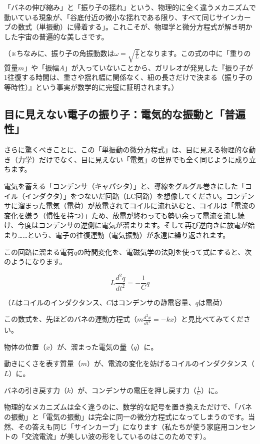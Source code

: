 「バネの伸び縮み」と「振り子の揺れ」という、物理的に全く違うメカニズムで動いている現象が、「谷底付近の微小な揺れである限り、すべて同じサインカーブの数式（単振動）に帰着する」。これこそが、物理学と微分方程式が解き明かした宇宙の普遍的な美しさです。

（※ちなみに、振り子の角振動数は\(\omega = \sqrt{\frac{g}{L}}\)となります。この式の中に「重りの質量\(m\)」や「振幅\(A\)」が入っていないことから、ガリレオが発見した『振り子が1往復する時間は、重さや揺れ幅に関係なく、紐の長さだけで決まる（振り子の等時性）』という事実が数学的に完璧に証明されます。）

\subsection{目に見えない電子の振り子：電気的な振動と「普遍性」}

さらに驚くべきことに、この「単振動の微分方程式」は、目に見える物理的な動き（力学）だけでなく、目に見えない「電気」の世界でも全く同じように成り立ちます。

電気を蓄える「コンデンサ（キャパシタ）」と、導線をグルグル巻きにした「コイル（インダクタ）」をつないだ回路（LC回路）を想像してください。コンデンサに溜まった電気（電荷）が放電されてコイルに流れ込むと、コイルは「電流の変化を嫌う（慣性を持つ）」ため、放電が終わっても勢い余って電流を流し続け、今度はコンデンサの逆側に電気が溜まります。そして再び逆向きに放電が始まり\ldots{}\ldots{}という、電子の往復運動（電気振動）が永遠に繰り返されます。

この回路に溜まる電荷\(q\)の時間変化を、電磁気学の法則を使って式にすると、次のようになります。

\[L \frac{d^2q}{dt^2} = -\frac{1}{C}q\]

（\(L\)はコイルのインダクタンス、\(C\)はコンデンサの静電容量、\(q\)は電荷）

この数式を、先ほどのバネの運動方程式（\(m \frac{d^2x}{dt^2} = -kx\)）と見比べてみてください。

物体の位置（\(x\)）が、溜まった電気の量（\(q\)）に。

動きにくさを表す質量（\(m\)）が、電流の変化を妨げるコイルのインダクタンス（\(L\)）に。

バネの引き戻す力（\(k\)）が、コンデンサの電圧を押し戻す力（\(\frac{1}{C}\)）に。

物理的なメカニズムは全く違うのに、数学的な記号を置き換えただけで、「バネの振動」と「電気の振動」は完全に同一の微分方程式になってしまうのです。当然、その答えも同じ「サインカーブ」になります（私たちが使う家庭用コンセントの「交流電流」が美しい波の形をしているのはこのためです）。

